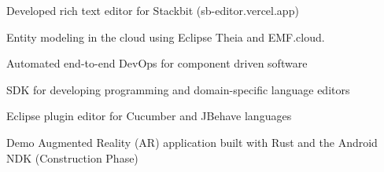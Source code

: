 
Developed rich text editor for Stackbit (sb-editor.vercel.app)

\divider

Entity modeling in the cloud using Eclipse Theia and EMF.cloud.

\divider

Automated end-to-end DevOps for component driven software

\divider

SDK for developing programming and domain-specific language editors

\divider

Eclipse plugin editor for Cucumber and JBehave languages

\divider

Demo Augmented Reality (AR) application built with Rust and the Android NDK (Construction Phase) 
